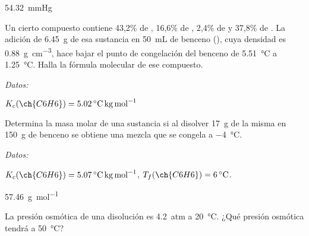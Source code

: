 \documentclass[10pt,a5paper,twoside]{article}
\newenvironment{gexdatos}{
      \vspace{2pt}
      \noindent\small\textit{Datos:}
    }{\vspace{5pt}}
\begin{document}
  \begin{solution}
    \SI{54.32}{\mmHg}
  \end{solution}




  \begin{exercise}[
      tags    = {termodinámica, entalpía, entalpia de reacción, calor},
      topics  = {química, termoquímica, termodinámica},
      source  = {FQ 1B OXF 2015, p79, e46},
    ]
    Un cierto compuesto contiene 43,2\% de , 16,6\% de , 2,4\% de  y 37,8\% de . La adición de \SI{6.45}{\gram} de esa sustancia en \SI{50}{\milli\liter} de benceno (), cuya densidad es \SI{0.88}{\gram\per\cubic\centi\meter}, hace bajar el punto de congelación del benceno de \SI{5.51}{\celsius} a \SI{1.25}{\celsius}. Halla la fórmula molecular de ese compuesto.

    \begin{gexdatos}
      \( K_c (\ch{C6H6}) = \SI{5.02}{\celsius\kilo\gram\per\mole} \)
    \end{gexdatos}
  \end{exercise}

  \begin{solution}
  \end{solution}



  \begin{exercise}[
      tags    = {termodinámica, entalpía, entalpia de reacción, calor},
      topics  = {química, termoquímica, termodinámica},
      source  = {FQ 1B SAN 2015, p94, e54},
    ]
    Determina la masa molar de una sustancia si al disolver \SI{17}{\gram} de la misma en \SI{150}{\gram} de benceno se obtiene una mezcla que se congela a \SI{-4}{\celsius}.

    \begin{gexdatos}
      \( K_c (\ch{C6H6}) = \SI{5.07}{\celsius\kilo\gram\per\mole} \),
      \( T_f (\ch{C6H6}) = \SI{6}{\celsius} \).
    \end{gexdatos}
  \end{exercise}

  \begin{solution}
    \SI{57.46}{\gram\per\mole}
  \end{solution}




  \begin{exercise}[
      tags    = {termodinámica, entalpía, entalpia de reacción, calor},
      topics  = {química, termoquímica, termodinámica},
      source  = {FQ 1B OXF 2015, p79, e48},
    ]
    La presión osmótica de una disolución es \SI{4.2}{atm} a \SI{20}{\celsius}. ¿Qué presión osmótica tendrá a \SI{50}{\celsius}?
  \end{exercise}
\end{document}
